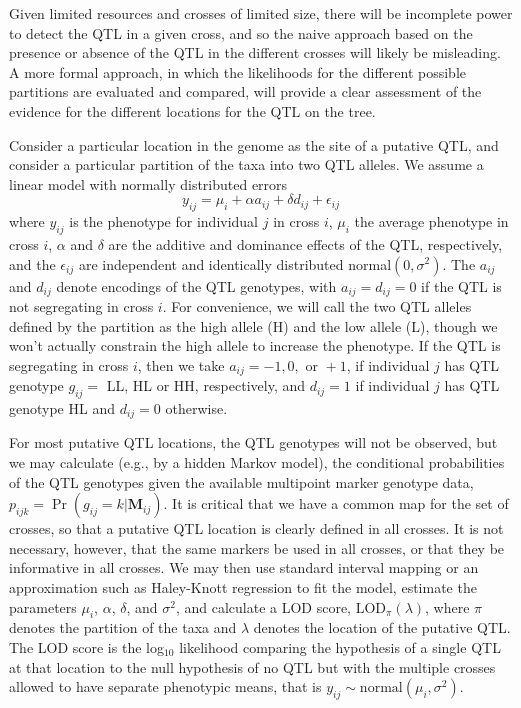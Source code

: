 \documentclass[12pt,letterpaper]{article}
\newcommand{\LOD}{\text{LOD}}
\begin{document}
Given limited resources and crosses of limited size, there will be
incomplete power to detect the QTL in a given cross, and so the naive
approach based on the presence or absence of the QTL in the different
crosses will likely be misleading.  A more formal approach, in which
the likelihoods for the different possible partitions are evaluated
and compared, will provide a clear assessment of the evidence for the
different locations for the QTL on the tree.  

Consider a particular location in the genome as the site of a putative
QTL, and consider a particular partition of the taxa into two QTL
alleles.  We assume a linear model with normally distributed errors
$$y_{ij} = \mu_i + \alpha a_{ij} + \delta d_{ij} + \epsilon_{ij}$$ 
where $y_{ij}$ is the phenotype for individual $j$ in cross $i$,
$\mu_i$ the average phenotype in cross $i$, $\alpha$ and $\delta$ are
the additive and dominance effects of the QTL, respectively,
and the $\epsilon_{ij}$ are independent and identically distributed
normal$(0, \sigma^2)$.  The $a_{ij}$ and $d_{ij}$ denote encodings of
the QTL genotypes, with $a_{ij} = d_{ij} = 0$ if the QTL is not
segregating in cross $i$.  For convenience, we will call the two QTL
alleles defined by the partition as the high allele (H) and the low
allele (L), though we won't actually constrain the high allele to
increase the phenotype.  If the QTL is segregating in cross
$i$, then we take $a_{ij} = -1, 0, \text{ or } +1$, if individual $j$
has QTL genotype $g_{ij} =$ LL, HL or HH, respectively, and $d_{ij} = 1$ if
individual $j$ has QTL genotype HL and $d_{ij} = 0$ otherwise.

For most putative QTL locations, the QTL genotypes will not be
observed, but we may calculate (e.g., by a hidden Markov model), the
conditional probabilities of the QTL genotypes given the available
multipoint marker genotype data, 
$p_{ijk} = \Pr(g_{ij} = k | \boldsymbol{M}_{ij})$.  It is critical
that we have a common map for the set of crosses, so that a putative
QTL location is clearly defined in all crosses.  It is not necessary,
however, that the same markers be used in all crosses, or that they be
informative in all crosses.  We may then use
standard interval mapping \citep{Lander1989} or an approximation such
as Haley-Knott regression \citep{Haley1992} to fit the model, 
estimate the parameters $\mu_i$, $\alpha$, $\delta$, and $\sigma^2$,
and calculate a LOD score, $\LOD_\pi(\lambda)$, where $\pi$ denotes the
partition of the taxa and $\lambda$ denotes the
location of the putative QTL.  The LOD score is the log$_{10}$
likelihood comparing the hypothesis of a single QTL at that location
to the null hypothesis of no QTL but with the multiple crosses allowed to
have separate phenotypic means, that is $y_{ij} \sim
\text{normal}(\mu_i, \sigma^2)$.  
\end{document}
